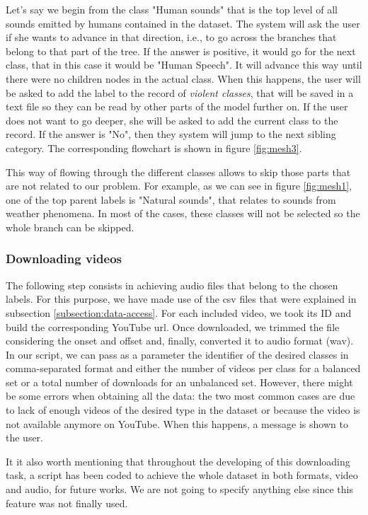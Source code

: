 	
	Let's say we begin from the class "Human sounds" that is the top level of all sounds emitted by humans contained in the dataset. The system will ask the user if she wants to advance in that direction, i.e., to go across the branches that belong to that part of the tree. If the answer is positive, it would go for the next class, that in this case it would be "Human Speech". It will advance this way until there were no children nodes in the actual class. When this happens, the user will be asked to add the label to the record of \textit{violent classes}, that will be saved in a text file so they can be read by other parts of the model further on. If the user does not want to go deeper, she will be asked to add the current class to the record. If the answer is "No", then they system will jump to the next sibling category. The corresponding flowchart is shown in figure \ref{fig:mesh3}.
	
	This way of flowing through the different classes allows to skip those parts that are not related to our problem. For example, as we can see in figure \ref{fig:mesh1}, one of the top parent labels is "Natural sounds", that relates to sounds from weather phenomena. In most of the cases, these classes will not be selected so the whole branch can be skipped. 

\subsubsection{Downloading videos}

	The following step consists in achieving audio files that belong to the chosen labels. For this purpose, we have made use of the \acrshort{csv} files that were explained in subsection \ref{subsection:data-access}. For each included video, we took its ID and build the corresponding YouTube \acrshort{url}. Once downloaded, we trimmed the file considering the onset and offset and, finally, converted it to audio format (\acrshort{wav}). In our script, we can pass as a parameter the identifier of the desired classes in comma-separated format and either the number of videos per class for a balanced set or a total number of downloads for an unbalanced set. However, there might be some errors when obtaining all the data: the two most common cases are due to lack of enough videos of the desired type in the dataset or because the video is not available anymore on YouTube. When this happens, a message is shown to the user.
	
	It it also worth mentioning that throughout the developing of this downloading task, a script has been coded to achieve the whole dataset in both formats, video and audio, for future works. We are not going to specify anything else since this feature was not finally used.

